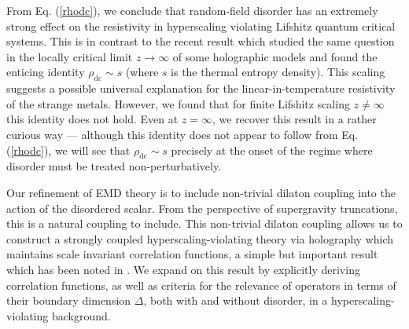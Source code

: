 \documentclass[10pt, oneside]{book}
\begin{document}
\begin{doublespace}
From Eq. (\ref{rhodc}), we conclude that random-field disorder has an extremely strong effect on the resistivity in hyperscaling violating Lifshitz quantum critical systems.    This is in contrast to the recent result \cite{Davison:2013txa} which studied the same question in the locally critical 
limit $z \rightarrow \infty$ of some holographic models and found the enticing identity $\rho_{\mathrm{dc}}\sim s$ (where $s$ is the thermal entropy density).    This scaling suggests a possible universal explanation for the linear-in-temperature resistivity of the strange metals.   However, we found that for finite Lifshitz scaling $z \neq \infty$ this identity does not hold.   Even at $z=\infty$, we recover this result in a rather curious way --- although this identity does not appear to follow from Eq. (\ref{rhodc}), we will see that $\rho_{\mathrm{dc}}\sim s$ precisely at the onset of the regime where disorder must be treated non-perturbatively.


Our refinement of EMD theory is to include non-trivial dilaton coupling into the action of the disordered scalar.   From the perspective of supergravity truncations, this is a natural coupling to include.   
This non-trivial dilaton coupling
allows us to construct a strongly coupled hyperscaling-violating theory via holography which {maintains scale invariant correlation functions}, a simple but important result which has been noted in \cite{Gath:2012pg, Gouteraux:2014hca}.  We expand on this result by explicitly deriving correlation functions, as well as criteria for the relevance of operators in terms of their boundary dimension $\Delta$, both with and without disorder, in a hyperscaling-violating background.



\end{doublespace}
\end{document}
